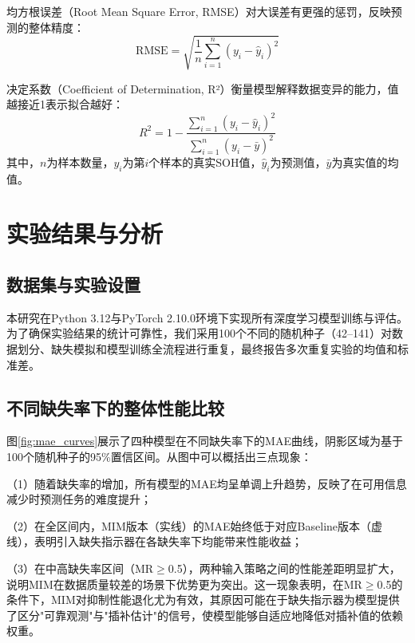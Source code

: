 \documentclass[10pt,a4paper]{ctexart}
\begin{document}
均方根误差（Root Mean Square Error, RMSE）对大误差有更强的惩罚，反映预测的整体精度：
\begin{equation}
    \text{RMSE} = \sqrt{\frac{1}{n} \sum_{i=1}^{n} (y_i - \hat{y}_i)^2}
    \label{eq:rmse}
\end{equation}

决定系数（Coefficient of Determination, R²）衡量模型解释数据变异的能力，值越接近1表示拟合越好：
\begin{equation}
    R^2 = 1 - \frac{\sum_{i=1}^{n} (y_i - \hat{y}_i)^2}{\sum_{i=1}^{n} (y_i - \bar{y})^2}
    \label{eq:r2}
\end{equation}
其中，$n$为样本数量，$y_i$为第$i$个样本的真实SOH值，$\hat{y}_i$为预测值，$\bar{y}$为真实值的均值。

\section{实验结果与分析}\label{sec:results}

\subsection{数据集与实验设置}

本研究在Python 3.12与PyTorch 2.10.0环境下实现所有深度学习模型训练与评估。为了确保实验结果的统计可靠性，我们采用100个不同的随机种子（42--141）对数据划分、缺失模拟和模型训练全流程进行重复，最终报告多次重复实验的均值和标准差。

\subsection{不同缺失率下的整体性能比较}

图\ref{fig:mae_curves}展示了四种模型在不同缺失率下的MAE曲线，阴影区域为基于100个随机种子的95\%置信区间。从图中可以概括出三点现象：

（1）随着缺失率的增加，所有模型的MAE均呈单调上升趋势，反映了在可用信息减少时预测任务的难度提升；

（2）在全区间内，MIM版本（实线）的MAE始终低于对应Baseline版本（虚线），表明引入缺失指示器在各缺失率下均能带来性能收益；

（3）在中高缺失率区间（MR$\geq$0.5），两种输入策略之间的性能差距明显扩大，说明MIM在数据质量较差的场景下优势更为突出。这一现象表明，在MR$\geq$0.5的条件下，MIM对抑制性能退化尤为有效，其原因可能在于缺失指示器为模型提供了区分"可靠观测"与"插补估计"的信号，使模型能够自适应地降低对插补值的依赖权重。
\end{document}
